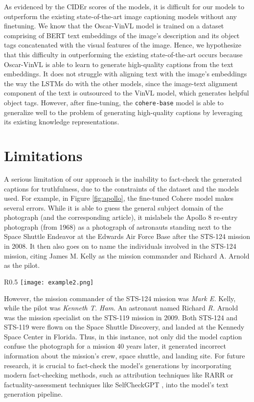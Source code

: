 \documentclass[11pt]{article}
\begin{document}
As evidenced by the CIDEr scores of the models, it is difficult for our models to outperform the existing state-of-the-art image captioning models without any finetuning. We know that the Oscar-VinVL model is trained on a dataset comprising of BERT text embeddings of the image's description and its object tags concatenated with the visual features of the image. Hence, we hypothesize that this difficulty in outperforming the existing state-of-the-art occurs because Oscar-VinVL is able to learn to generate high-quality captions from the text embeddings. It does not struggle with aligning text with the image's embeddings the way the LSTMs do with the other models, since the image-text alignment component of the text is outsourced to the VinVL model, which generates helpful object tags. However, after fine-tuning, the \texttt{cohere-base} model is able to generalize well to the problem of generating high-quality captions by leveraging its existing knowledge representations.

\section{Limitations}
\label{sec:6}

A serious limitation of our approach is the inability to fact-check the generated captions for truthfulness, due to the constraints of the dataset and the models used. For example, in Figure \ref{fig:apollo}, the fine-tuned Cohere model makes several errors. While it is able to guess the general subject domain of the photograph (and the corresponding article), it mislabels the Apollo 8 re-entry photograph (from 1968) as a photograph of astronauts standing next to the Space Shuttle Endeavor at the Edwards Air Force Base after the STS-124 mission in 2008. It then also goes on to name the individuals involved in the STS-124 mission, citing James M. Kelly as the mission commander and Richard A. Arnold as the pilot. 

\begin{wrapfigure}{R}{0.5\textwidth}
    \centering
    \texttt{[image: example2.png]}
    \caption{Caption generation for the Apollo 8 re-entry image, taken from \url{https://commons.wikimedia.org/wiki/File:Apollo_8_reentry,_December_27,_1968.jpg}}
    \label{fig:apollo}
\end{wrapfigure}

However, the mission commander of the STS-124 mission was \textit{Mark E.} Kelly, while the pilot was \textit{Kenneth T. Ham}. An astronaut named Richard \textit{R.} Arnold was the mission specialist on the STS-119 mission in 2009. Both STS-124 and STS-119 were flown on the Space Shuttle Discovery, and landed at the Kennedy Space Center in Florida. Thus, in this instance, not only did the model caption confuse the photograph for a mission 40 years later, it generated incorrect information about the mission's crew, space shuttle, and landing site. For future research, it is crucial to fact-check the model's generations by incorporating modern fact-checking methods, such as attribution techniques like RARR \cite{gao2022attributed} or factuality-assessment techniques like SelfCheckGPT \cite{manakul2023selfcheckgpt}, into the model's text generation pipeline. 
\end{document}
